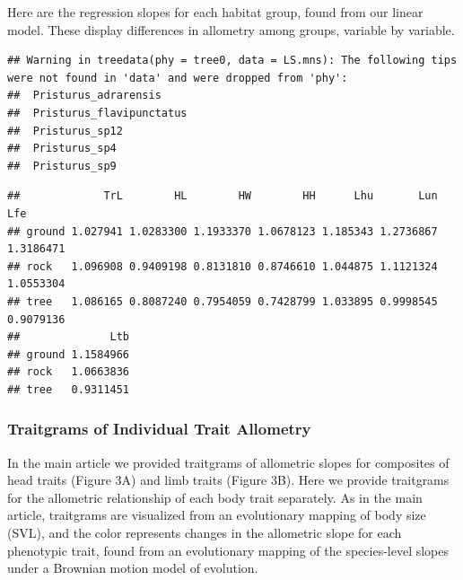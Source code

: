\documentclass[
  11pt,
]{article}
\newenvironment{Shaded}{\begin{snugshade}}{\end{snugshade}}
\newcommand{\AttributeTok}[1]{\textcolor[rgb]{0.77,0.63,0.00}{#1}}
\newcommand{\CommentTok}[1]{\textcolor[rgb]{0.56,0.35,0.01}{\textit{#1}}}
\newcommand{\DecValTok}[1]{\textcolor[rgb]{0.00,0.00,0.81}{#1}}
\newcommand{\FunctionTok}[1]{\textcolor[rgb]{0.00,0.00,0.00}{#1}}
\newcommand{\NormalTok}[1]{#1}
\newcommand{\OtherTok}[1]{\textcolor[rgb]{0.56,0.35,0.01}{#1}}
\newcommand{\SpecialCharTok}[1]{\textcolor[rgb]{0.00,0.00,0.00}{#1}}
\begin{document}
Here are the regression slopes for each habitat group, found from our
linear model. These display differences in allometry among groups,
variable by variable.

\begin{verbatim}
## Warning in treedata(phy = tree0, data = LS.mns): The following tips were not found in 'data' and were dropped from 'phy':
##  Pristurus_adrarensis
##  Pristurus_flavipunctatus
##  Pristurus_sp12
##  Pristurus_sp4
##  Pristurus_sp9
\end{verbatim}

\begin{Shaded}
\end{Shaded}

\begin{verbatim}
##             TrL        HL        HW        HH      Lhu       Lun       Lfe
## ground 1.027941 1.0283300 1.1933370 1.0678123 1.185343 1.2736867 1.3186471
## rock   1.096908 0.9409198 0.8131810 0.8746610 1.044875 1.1121324 1.0553304
## tree   1.086165 0.8087240 0.7954059 0.7428799 1.033895 0.9998545 0.9079136
##              Ltb
## ground 1.1584966
## rock   1.0663836
## tree   0.9311451
\end{verbatim}

\newpage

\hypertarget{traitgrams-of-individual-trait-allometry}{%
\subsubsection{Traitgrams of Individual Trait
Allometry}\label{traitgrams-of-individual-trait-allometry}}

In the main article we provided traitgrams of allometric slopes for
composites of head traits (Figure 3A) and limb traits (Figure 3B). Here
we provide traitgrams for the allometric relationship of each body trait
separately. As in the main article, traitgrams are visualized from an
evolutionary mapping of body size (SVL), and the color represents
changes in the allometric slope for each phenotypic trait, found from an
evolutionary mapping of the species-level slopes under a Brownian motion
model of evolution.
\end{document}
